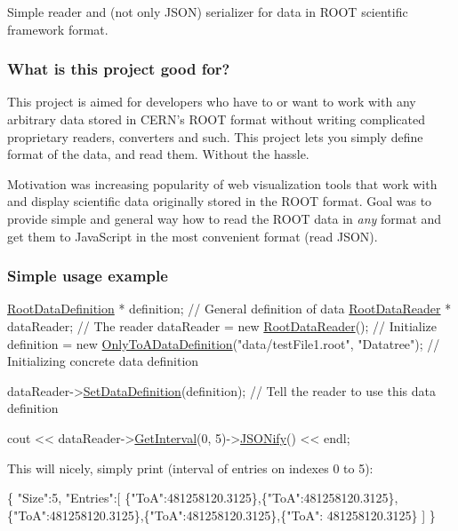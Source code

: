 Simple reader and (not only J\+S\+O\+N) serializer for data in R\+O\+O\+T scientific framework format.

\subsubsection*{What is this project good for?}

This project is aimed for developers who have to or want to work with any arbitrary data stored in C\+E\+R\+N's R\+O\+O\+T format without writing complicated proprietary readers, converters and such. This project lets you simply define format of the data, and read them. Without the hassle.

Motivation was increasing popularity of web visualization tools that work with and display scientific data originally stored in the R\+O\+O\+T format. Goal was to provide simple and general way how to read the R\+O\+O\+T data in {\itshape any} format and get them to Java\+Script in the most convenient format (read J\+S\+O\+N).

\subsubsection*{Simple usage example}


\begin{DoxyCode}
\hyperlink{classRootDataDefinition}{RootDataDefinition} * definition;        \textcolor{comment}{// General definition of data }
\hyperlink{classRootDataReader}{RootDataReader} * dataReader;            \textcolor{comment}{// The reader}
dataReader = \textcolor{keyword}{new} \hyperlink{classRootDataReader}{RootDataReader}();      \textcolor{comment}{// Initialize}
definition = \textcolor{keyword}{new} \hyperlink{classOnlyToADataDefinition}{OnlyToADataDefinition}(\textcolor{stringliteral}{"data/testFile1.root"}, \textcolor{stringliteral}{"Datatree"});  \textcolor{comment}{//
       Initializing concrete data definition}

dataReader->\hyperlink{classRootDataReader_ad670745df69f90ea6578d7c29cab716f}{SetDataDefinition}(definition);  \textcolor{comment}{// Tell the reader to use this data definition}

cout << dataReader->\hyperlink{classRootDataReader_a76a02dd2cc6f4cde896ce9180048671b}{GetInterval}(0, 5)->\hyperlink{classDataEntryInterval_ad27bffbb603c300714090c809ee58570}{JSONify}() << endl;
\end{DoxyCode}
 This will nicely, simply print (interval of entries on indexes 0 to 5)\+: 
\begin{DoxyCode}
\{
  \textcolor{stringliteral}{"Size"}:5,
  \textcolor{stringliteral}{"Entries"}:[
    \{\textcolor{stringliteral}{"ToA"}:481258120.3125\},\{\textcolor{stringliteral}{"ToA"}:481258120.3125\},\{\textcolor{stringliteral}{"ToA"}:481258120.3125\},\{\textcolor{stringliteral}{"ToA"}:481258120.3125\},\{\textcolor{stringliteral}{"ToA"}:
      481258120.3125\}
  ]
\}
\end{DoxyCode}
